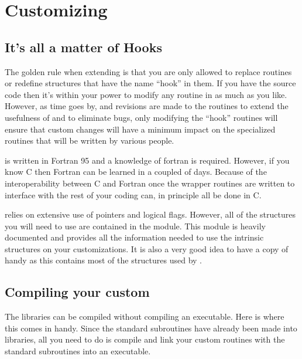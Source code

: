 \chapter{Customizing \tao}
\label{c:custom_tao}

\section{It's all a matter of Hooks}

The golden rule when extending \tao is that you are only allowed to replace
routines or redefine structures that have the name ``hook'' in them.  If you
have the source code then it's within your power to modify any routine in \tao
as much as you like. However, as time goes by, and revisions are made to the
\tao routines to extend the usefulness of \tao and to eliminate bugs, only
modifying the ``hook'' routines will ensure that custom changes will have a
minimum impact on the specialized routines that will be written by various
people. 

\tao is written in Fortran 95 and a knowledge of fortran is required. However,
if you know C then Fortran can be learned in a coupled of days. Because of the
interoperability between C and Fortran once the wrapper routines are written to
interface with \tao the rest of your coding can, in principle all be done in C.

\tao relies on extensive use of pointers and logical flags. However, all of the
structures you will need to use are contained in the 
module. This module is heavily documented and provides all the information
needed to use the intrinsic \tao structures on your customizations. It is also a
very good idea to have a copy of  handy as this contains
most of the structures used by \bmad.

\section{Compiling your custom \tao}

The \tao libraries can be compiled without compiling an executable. Here is
where this comes in handy. Since the standard \tao subroutines have already been
made into libraries, all you need to do is compile and link your custom
routines with the standard \tao subroutines into an executable.

